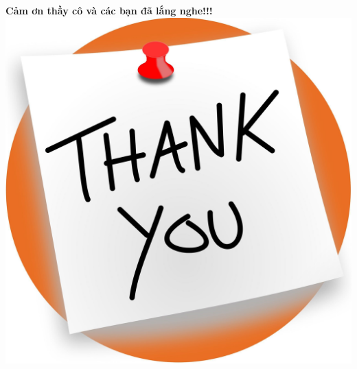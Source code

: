 \documentclass[11pt]{beamer}
\begin{document}
\begin{frame}
	\begin{center}
		\color{red}
		\textbf{Cảm ơn thầy cô và các bạn đã lắng nghe!!!}
		\includegraphics[scale=.1]{hinh16.jpg}
	\end{center}
\end{frame}
\end{document}
